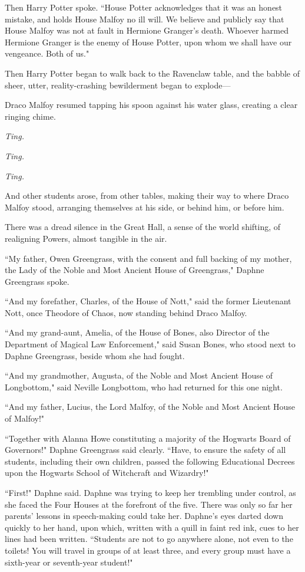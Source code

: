 Then Harry Potter spoke. ``House Potter acknowledges that it was an honest mistake, and holds House Malfoy no ill will. We believe and publicly say that House Malfoy was not at fault in Hermione Granger's death. Whoever harmed Hermione Granger is the enemy of House Potter, upon whom we shall have our vengeance. Both of us."

Then Harry Potter began to walk back to the Ravenclaw table, and the babble of sheer, utter, reality-crashing bewilderment began to explode—

Draco Malfoy resumed tapping his spoon against his water glass, creating a clear ringing chime.

\emph{Ting.}

\emph{Ting.}

\emph{Ting.}

And other students arose, from other tables, making their way to where Draco Malfoy stood, arranging themselves at his side, or behind him, or before him.

There was a dread silence in the Great Hall, a sense of the world shifting, of realigning Powers, almost tangible in the air.

``My father, Owen Greengrass, with the consent and full backing of my mother, the Lady of the Noble and Most Ancient House of Greengrass," Daphne Greengrass spoke.

``And my forefather, Charles, of the House of Nott," said the former Lieutenant Nott, once Theodore of Chaos, now standing behind Draco Malfoy.

``And my grand-aunt, Amelia, of the House of Bones, also Director of the Department of Magical Law Enforcement," said Susan Bones, who stood next to Daphne Greengrass, beside whom she had fought.

``And my grandmother, Augusta, of the Noble and Most Ancient House of Longbottom," said Neville Longbottom, who had returned for this one night.

``And my father, Lucius, the Lord Malfoy, of the Noble and Most Ancient House of Malfoy!"

``Together with Alanna Howe constituting a majority of the Hogwarts Board of Governors!" Daphne Greengrass said clearly. ``Have, to ensure the safety of all students, including their own children, passed the following Educational Decrees upon the Hogwarts School of Witchcraft and Wizardry!"

\later

``First!" Daphne said. Daphne was trying to keep her trembling under control, as she faced the Four Houses at the forefront of the five. There was only so far her parents' lessons in speech-making could take her. Daphne's eyes darted down quickly to her hand, upon which, written with a quill in faint red ink, cues to her lines had been written. ``Students are not to go anywhere alone, not even to the toilets! You will travel in groups of at least three, and every group must have a sixth-year or seventh-year student!"


